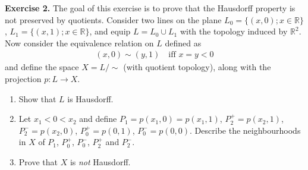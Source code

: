 \documentclass[12pt]{article}
\begin{document}
\noindent\textbf{Exercise 2.}
The goal of this exercise is to prove that the Hausdorff property is not preserved by quotients. Consider two lines on the plane $L_0 = \{(x,0); x \in \mathbb{R}\}$, $L_1 = \{(x,1); x \in \mathbb{R}\}$, and equip $L = L_0 \cup L_1$ with the topology induced by $\mathbb{R}^2$. Now consider the equivalence relation on $L$ defined as
\begin{align*}
(x,0) \sim (y,1) \quad \text{iff } x = y < 0
\end{align*}
and define the space $X = L/{\sim}$ (with quotient topology), along with the projection $p : L \to X$.
\begin{enumerate}
\item[i)] Show that $L$ is Hausdorff.
\item[ii)] Let $x_1 < 0 < x_2$ and define $P_1 = p(x_1,0) = p(x_1,1)$, $P_2^+ = p(x_2,1)$, $P_2^- = p(x_2,0)$, $P_0^+ = p(0,1)$, $P_0^- = p(0,0)$. Describe the neighbourhoods in $X$ of $P_1$, $P_0^+$, $P_0^-$, $P_2^+$ and $P_2^-$.
\item[iii)] Prove that $X$ is \emph{not} Hausdorff.
\end{enumerate}
\begin{center}
\end{center}

\clearpage
\end{document}
